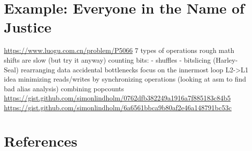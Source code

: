 \documentclass[openany]{book}
\begin{document}
\chapter{Example: Everyone in the Name of Justice}
\url{https://www.luogu.com.cn/problem/P5066}
7 types of operations
rough math
shifts are slow (but try it anyway)
counting bits:
- shuffles
- bitslicing (Harley-Seal)
rearranging data
accidental bottlenecks
focus on the innermost loop
L2->L1 idea
minimizing reads/writes by synchronizing operations
(looking at asm to find bad alias analysis)
combining popcounts
\url{https://gist.github.com/simonlindholm/0762dfb382249a1916a7f885183c84b5}
\url{https://gist.github.com/simonlindholm/6a6561bbca9b80af2e46a148791bc53c}

\appendix
\chapter*{References}

\end{document}
